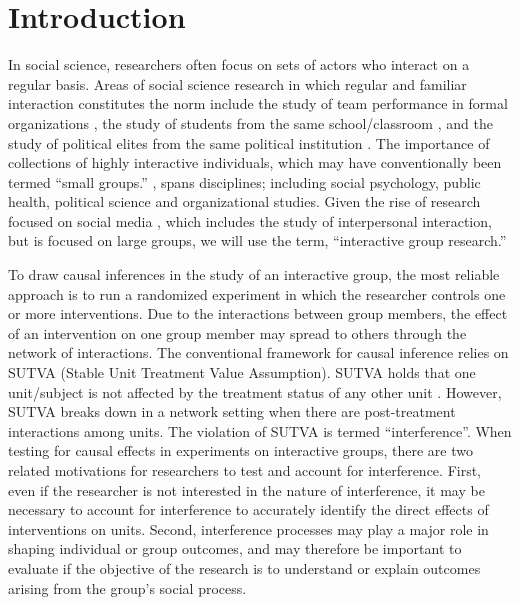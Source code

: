 \documentclass[12pt]{article}
\begin{document}
\thispagestyle{empty}
\doublespacing

\section{Introduction}

In social science, researchers often focus on sets of actors who interact on a regular basis. Areas of social science research in which regular and familiar interaction constitutes the norm include the study of team performance in formal organizations \citep[e.g., ][]{anderson1992}, the study of students from the same school/classroom \citep[e.g., ][]{sallis1997}, and the study of political elites from the same political institution \citep[e.g.,][]{bratton1999}. The importance of collections of highly interactive individuals, which may have conventionally been termed ``small groups.'' \citep{levine1990}, spans disciplines; including social psychology, public health, political science and organizational studies. Given the rise of research focused on social media \citep{agichtein2008}, which includes the study of interpersonal interaction, but is focused on large groups, we will use the term, ``interactive group research.'' 

To draw causal inferences in the study of an interactive group, the most reliable approach is to run a randomized experiment in which the researcher controls one or more interventions. Due to the interactions between group members, the effect of an intervention on one group member may spread to others through the network of interactions. The conventional framework for causal inference relies on SUTVA (Stable Unit Treatment Value Assumption). SUTVA holds that one unit/subject is not affected by the treatment status of any other unit \citep{sekhon2008}. However, SUTVA breaks down in a network setting \citep{galea2010} when there are post-treatment interactions among units. The violation of SUTVA is termed ``interference''.  When testing for causal effects in experiments on interactive groups, there are two related motivations for researchers to test and account for interference. First, even if the researcher is not interested in the nature of interference, it may be necessary to account for interference to accurately identify the direct effects of interventions on units. Second, interference processes may play a major role in shaping individual or group outcomes, and may therefore be important to evaluate if the objective of the research is to understand or explain outcomes arising from the group's social process. 
\end{document}
